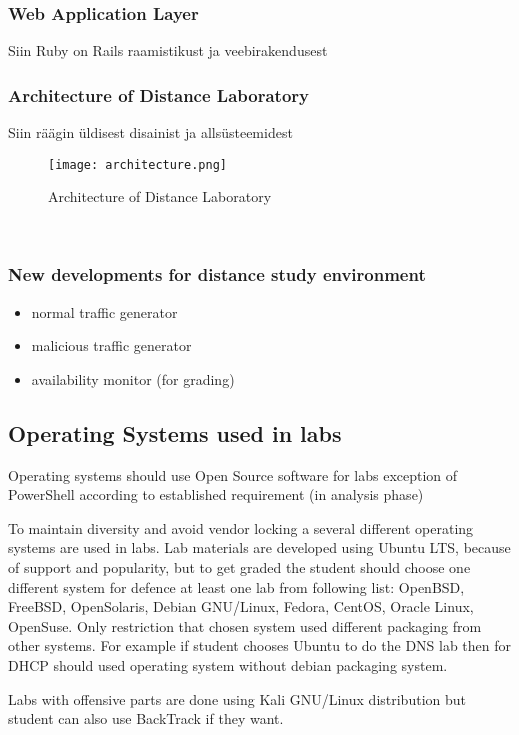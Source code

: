 \subsubsection{Web Application Layer}
Siin Ruby on Rails raamistikust ja veebirakendusest
\subsubsection{Architecture of Distance Laboratory}
Siin räägin üldisest disainist ja allsüsteemidest
\
\begin{figure}[ht]
\centering
\texttt{[image: architecture.png]}
\caption{Architecture of Distance Laboratory}
\label{fig:Architecture of Distance Laboratory}
\end{figure}
\

\subsubsection{New developments for distance study environment}

\begin{itemize}
	\item normal traffic generator
	\item malicious traffic generator
	\item availability monitor (for grading)
\end{itemize}

\subsection{Operating Systems used in labs}
Operating systems should use Open Source software for labs exception of PowerShell according to established requirement (in analysis phase)

To maintain diversity and avoid vendor locking a several different operating systems are used in labs. Lab materials are developed using Ubuntu LTS, because of support and popularity, but to get graded the student should choose one different system for defence at least one lab from following list: OpenBSD, FreeBSD, OpenSolaris, Debian GNU/Linux, Fedora, CentOS, Oracle Linux, OpenSuse. Only restriction that chosen system used different packaging from other systems. For example if student chooses Ubuntu to do the \gls{DNS} lab then for \gls{DHCP} should used operating system without debian packaging system.

Labs with offensive parts are done using Kali GNU/Linux distribution but student can also use BackTrack if they want.

